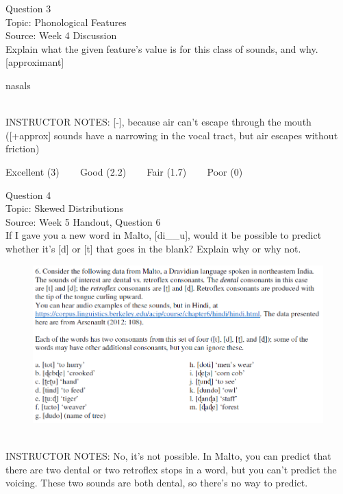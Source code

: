 \documentclass[12pt]{article}
\begin{document}
{\large Question 3}\\

Topic: Phonological Features\\
Source: Week 4 Discussion\\

Explain what the given feature’s value is for this class of sounds, and why.\\

{[approximant]}

nasals


~\\
INSTRUCTOR NOTES: [-], because air can't escape through the mouth ([+approx] sounds have a narrowing in the vocal tract, but air escapes without friction)


\vfill
Excellent (3) ~~~ Good (2.2) ~~~ Fair (1.7) ~~~ Poor (0)
\newpage

{\large Question 4}\\

Topic: Skewed Distributions\\
Source: Week 5 Handout, Question 6\\

If I gave you a new word in Malto, [di\_\_u], would it be possible to predict whether it's [d] or [t] that goes in the blank? Explain why or why not.\\

\begin{figure}[H]
\includegraphics{../images/malto.png}
\end{figure}

~\\
INSTRUCTOR NOTES: No, it's not possible. In Malto, you can predict that there are two dental or two retroflex stops in a word, but you can't predict the voicing. These two sounds are both dental, so there's no way to predict.
\end{document}
